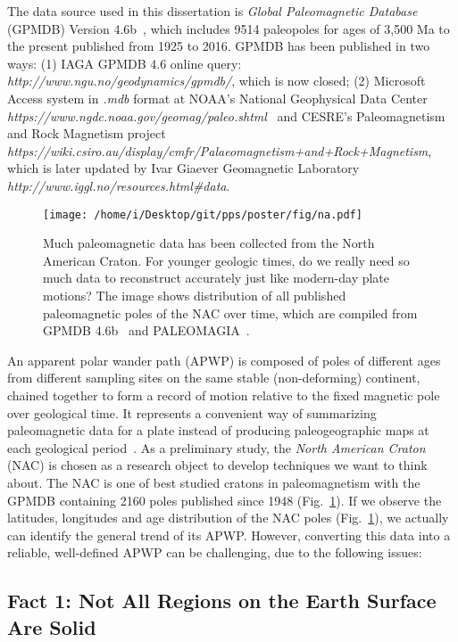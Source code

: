 The data source used in this dissertation is \emph{Global Paleomagnetic
Database} (GPMDB) Version 4.6b~\cite[updated in 2016 by the Ivar Giaever
Geomagnetic Laboratory team, in collaboration with Pisarevsky]{M96,P05}, which
includes 9514 paleopoles for ages of 3,500 Ma to the present published from 1925
to 2016. GPMDB has been published in two ways: (1) IAGA GPMDB 4.6 online query:
\emph{http://www.ngu.no/geodynamics/gpmdb/}, which is now closed; (2) Microsoft
Access system in \emph{.mdb} format at NOAA's National Geophysical Data Center
\emph{https://www.ngdc.noaa.gov/geomag/paleo.shtml}~\citep{P03}
and CESRE's Paleomagnetism and Rock Magnetism project
\emph{https://wiki.csiro.au/display/cmfr/Palaeomagnetism+and+Rock+Magnetism},
which is later updated by Ivar Giaever Geomagnetic Laboratory
\emph{http://www.iggl.no/resources.html\#data}.

\begin{figure}
\centering
\texttt{[image: /home/i/Desktop/git/pps/poster/fig/na.pdf]}
\captionsetup{width=.95\textwidth}
\caption{Much paleomagnetic data has been collected from the North American
Craton. For younger geologic times, do we really need so much data to
reconstruct accurately just like modern-day plate motions? The image shows
distribution of all published paleomagnetic poles of the NAC over time, which
are compiled from GPMDB 4.6b~\citep{P05} and
PALEOMAGIA~\citep{V14}.}\label{Fig:chap_intro_nacpole}
\end{figure}

An apparent polar wander path (APWP) is composed of poles of different ages
from different sampling sites on the same stable (non-deforming) continent,
chained together to form a record of motion relative to the fixed magnetic pole
over geological time. It represents a convenient way of summarizing
paleomagnetic data for a plate instead of producing paleogeographic maps at
each geological period~\citep{T08}. As a preliminary study, the \emph{North
American Craton} (NAC) is chosen as a research object to develop techniques we
want to think about. The NAC is one of best studied cratons in paleomagnetism
with the GPMDB containing 2160 poles published since 1948
(Fig.~\ref{Fig:chap_intro_nacpole}). If we observe the latitudes, longitudes and
age distribution of the NAC poles (Fig.~\ref{Fig:chap_intro_nacpole}), we
actually can identify the general trend of its APWP\@. However, converting this
data into a reliable, well-defined APWP can be challenging, due to the following
issues:

\subsection{Fact 1: Not All Regions on the Earth Surface Are Solid}

